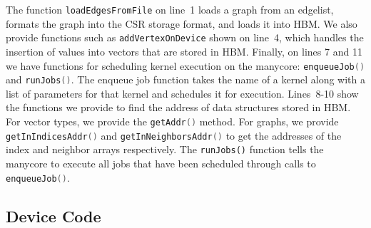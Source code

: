 The function \lstinline[language=C++, basicstyle=\small\ttfamily]{loadEdgesFromFile} on line~1 loads a graph from an edgelist, formats the graph into the CSR storage format, and loads it into HBM. 
We also provide functions such as \lstinline[language=C++, basicstyle=\small\ttfamily]{addVertexOnDevice} shown on line~4, which handles the insertion of values into vectors that are stored in HBM. 
Finally, on lines 7 and 11 we have functions for scheduling kernel execution on the manycore: \lstinline[language=C++, basicstyle=\small\ttfamily]{enqueueJob()} and \lstinline[language=C++, basicstyle=\small\ttfamily]{runJobs()}.
The enqueue job function takes the name of a kernel along with a list of parameters for that kernel and schedules it for execution.
Lines~8-10 show the functions we provide to find the address of data structures stored in HBM. 
For vector types, we provide the \lstinline[language=C++, basicstyle=\small\ttfamily]{getAddr()} method.
For graphs, we provide \lstinline[language=C++, basicstyle=\small\ttfamily]{getInIndicesAddr()} and \lstinline[language=C++, basicstyle=\small\ttfamily]{getInNeighborsAddr()} to get the addresses of the index and neighbor arrays respectively.
The \lstinline{runJobs()} function tells the manycore to execute all jobs that have been scheduled through calls to \lstinline[language=C++, basicstyle=\small\ttfamily]{enqueueJob()}.

\subsection{Device Code}

